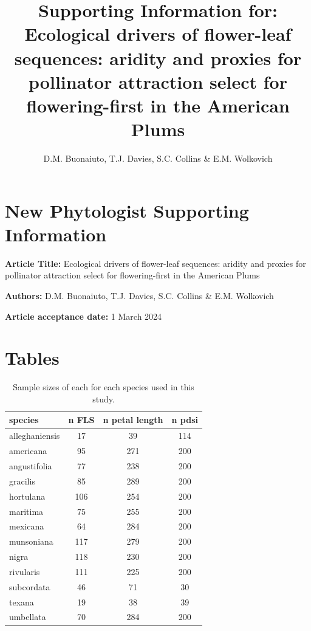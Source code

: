 \documentclass{article}[11pt]
\title{Supporting Information for: Ecological drivers of flower-leaf sequences: aridity and proxies for pollinator attraction select for flowering-first in the American Plums}
\author{D.M. Buonaiuto, T.J. Davies, S.C. Collins \& E.M. Wolkovich}
\date{}
\begin{document}

\section*{New Phytologist Supporting Information}
\textbf{Article Title:} Ecological drivers of flower-leaf sequences: aridity and proxies for pollinator attraction select for flowering-first in the American Plums

\textbf{Authors:} D.M. Buonaiuto, T.J. Davies, S.C. Collins \& E.M. Wolkovich

\textbf{Article acceptance date:} 1 March 2024

\section*{Tables}
\begin{table}[ht]
\centering
\begin{tabular}{|lccc|}
  \hline
  species & n FLS & n petal length & n pdsi \\ 
  \hline
 alleghaniensis &  17 &  39 & 114 \\ 
americana &  95 & 271 & 200 \\ 
angustifolia &  77 & 238 & 200 \\ 
 gracilis &  85 & 289 & 200 \\ 
 hortulana & 106 & 254 & 200 \\ 
  maritima &  75 & 255 & 200 \\ 
  mexicana &  64 & 284 & 200 \\ 
  munsoniana & 117 & 279 & 200 \\ 
 nigra & 118 & 230 & 200 \\ 
   rivularis & 111 & 225 & 200 \\ 
   subcordata &  46 &  71 &  30 \\ 
   texana &  19 &  38 &  39 \\ 
  umbellata &  70 & 284 & 200 \\ 
   \hline
\end{tabular}
\caption{Sample sizes of each for each species used in this study.}
\label{tab:samps}
\end{table}
\end{document}
